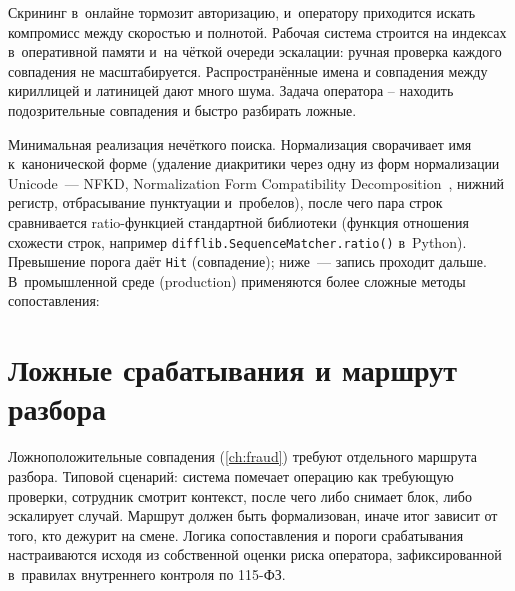Скрининг в~онлайне тормозит авторизацию, и~оператору приходится
искать компромисс между скоростью и полнотой. Рабочая система строится на индексах
в~оперативной памяти и~на чёткой очереди эскалации: ручная проверка
каждого совпадения не масштабируется. Распространённые имена
и совпадения между кириллицей и латиницей дают много шума.
Задача оператора -- находить подозрительные совпадения
и быстро разбирать ложные.

Минимальная реализация нечёткого поиска. Нормализация сворачивает
имя к~канонической форме (удаление диакритики через одну из форм
нормализации Unicode~--- NFKD, Normalization Form Compatibility
Decomposition~\cite{unicode-uax15}, нижний регистр, отбрасывание
пунктуации и~пробелов), после чего пара строк сравнивается
ratio-функцией стандартной библиотеки (функция отношения схожести
строк, например \texttt{difflib.SequenceMatcher.ratio()} в~Python).
Превышение порога даёт \texttt{Hit} (совпадение); ниже~--- запись
проходит дальше. В~промышленной среде (production) применяются
более сложные методы сопоставления:


\section{Ложные срабатывания и маршрут разбора}\label{sec:sanctions-false-positives}

Ложноположительные совпадения (\autoref{ch:fraud}) требуют
отдельного маршрута разбора.
Типовой сценарий: система помечает операцию как требующую проверки,
сотрудник смотрит контекст, после чего либо снимает блок, либо
эскалирует случай. Маршрут должен быть формализован, иначе итог
зависит от того, кто дежурит на смене. Логика сопоставления
и пороги срабатывания настраиваются исходя из собственной оценки
риска оператора, зафиксированной в~правилах внутреннего контроля
по 115-ФЗ.

